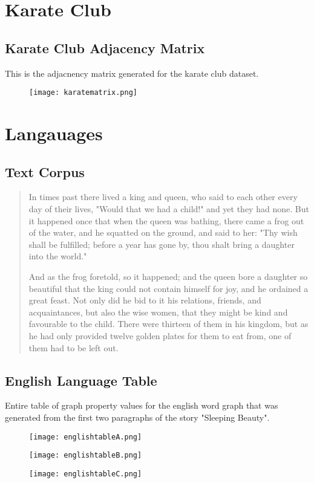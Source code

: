 \begin{appendices}
\chapter{Karate Club}
\section{Karate Club Adjacency Matrix}\label{app:karateadj}
This is the adjacnency matrix generated for the karate club dataset.
\begin{figure}[H]
	\centering
	\texttt{[image: karatematrix.png]}
\end{figure}

\chapter{Langauages}
\section{Text Corpus}
\begin{quote}
In times past there lived a king and queen, who said to each other every day of their lives, "Would that we had a child!" and yet they had none. But it happened once that when the queen was bathing, there came a frog out of the water, and he squatted on the ground, and said to her: "Thy wish shall be fulfilled; before a year has gone by, thou shalt bring a daughter into the world."

And as the frog foretold, so it happened; and the queen bore a daughter so beautiful that the king could not contain himself for joy, and he ordained a great feast. Not only did he bid to it his relations, friends, and acquaintances, but also the wise women, that they might be kind and favourable to the child. There were thirteen of them in his kingdom, but as he had only provided twelve golden plates for them to eat from, one of them had to be left out.
\end{quote}
\section{English Language Table}\label{app:engtable}
Entire table of graph property values for the english word graph that was generated from the first two paragraphs of the story "Sleeping Beauty".
\begin{figure}[H]
	\centering
	\texttt{[image: englishtableA.png]}
\end{figure}
\begin{figure}[H]
	\centering
	\texttt{[image: englishtableB.png]}
\end{figure}
\begin{figure}[H]
	\centering
	\texttt{[image: englishtableC.png]}
\end{figure}

\end{appendices}